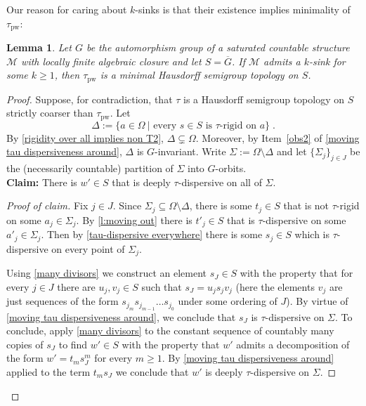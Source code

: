 \documentclass{article}
\newtheorem{lemma}[theorem]{Lemma}
\theoremstyle{remark}
\theoremstyle{definition}
\newcommand{\M}[0]{\mathcal{M}}
\newcommand{\pw}[0]{\tau_{\mathrm{pw}}}
\newcommand*{\greysquare}{\textcolor{gray}{\blacksquare}}
\newenvironment{subproof}[1][\proofname]{%
\renewcommand{\qedsymbol}{$\greysquare$}%
\begin{proof}[#1]%
	}{%
\end{proof}%
}
\renewcommand\geq{\geqslant}
\begin{document}
{{{{{Our reason for caring about $k$-sinks is that their existence implies minimality of $\pw$:
  
\begin{lemma}\label{abstract minimality endomorphism monoids}
  	Let $G$ be the automorphism group of a saturated countable structure $\M$ with locally finite algebraic closure and let $S=\overline{G}$. If $\M$ admits a $k$-sink for some $k\geq 1$, then $\pw$ is a minimal Hausdorff semigroup topology on $S$. 
  \end{lemma}
  \begin{proof}
  	Suppose, for contradiction, that $\tau$ is a Hausdorff semigroup topology on
  $S$ strictly coarser than $\pw$. Let 
    \[\Delta:=\{a\in\Omega \ \vert \text{ every } s\in S \text{ is }\tau\text{-rigid on } a\}\;.\]
By \cref{rigidity over all implies non T2}, $\Delta\subsetneq\Omega$. {Moreover, by Item~\eqref{obs2} of \cref{moving tau dispersiveness around}, $\Delta$ is $G$-invariant.} Write $\Sigma:=\Omega\setminus \Delta$ and let $\{\Sigma_{j}\}_{j\in J}$ be the (necessarily countable) partition of $\Sigma$ into $G$-orbits.\\
  	
\textbf{Claim:}  	  There is $w'\in S$  that is deeply $\tau$-dispersive on all of $\Sigma$. 
  	\begin{subproof}[Proof of claim]
  	 Fix $j\in J$. Since $\Sigma_j\subseteq\Omega\setminus\Delta$, there is some $t_{j}\in S$ that is not $\tau$-rigid on some $a_{j}\in\Sigma_{j}$.  
     By \cref{l:moving out} there is $t'_{j}\in S$ that is $\tau$-dispersive on some $a'_{j}\in\Sigma_{j}$. Then by \cref{tau-dispersive everywhere} there {is}
     some $s_{j}\in S$ which is $\tau$-dispersive on every point of $\Sigma_{j}$. 
 
  	 Using \cref{many divisors} we construct an element $s_{J}\in S$ with the property that for every $j\in J$ there are $u_j, v_j\in S$ %
     such that $s_{J}=u_{j}s_{j}v_{j}$ (here the elements $v_j$ are just sequences of the form $s_{j_m}s_{j_{m-1}}\dots s_{j_0}$ under some ordering of $J$). By virtue of \cref{moving tau dispersiveness around}, we conclude that $s_{J}$ is $\tau$-dispersive on $\Sigma$. 
     To conclude, apply \cref{many divisors} to the constant sequence of countably many copies of $s_J$ to find $w'\in S$ with the property that $w'$ admits a decomposition of the form $w'=t_{m}s_{J}^{m}$ for every $m\geq 1$. By  \cref{moving tau dispersiveness around} applied to the term $t_{m}s_{J}$ we conclude that $w'$ is deeply $\tau$-dispersive on $\Sigma$.  
  	\end{subproof}


\end{proof}}}}}}
\end{document}
